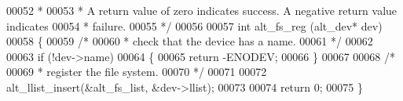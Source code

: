 \begin{DoxyCode}
00052 \textcolor{comment}{ *}
00053 \textcolor{comment}{ * A return value of zero indicates success. A negative return value indicates}
00054 \textcolor{comment}{ * failure. }
00055 \textcolor{comment}{ */}
00056  
00057 \textcolor{keywordtype}{int} alt_fs_reg (alt_dev* dev)
00058 \{
00059   \textcolor{comment}{/*}
00060 \textcolor{comment}{   * check that the device has a name.}
00061 \textcolor{comment}{   */}
00062 
00063   \textcolor{keywordflow}{if} (!dev->name)
00064   \{
00065     \textcolor{keywordflow}{return} -ENODEV;
00066   \}
00067   
00068   \textcolor{comment}{/*}
00069 \textcolor{comment}{   * register the file system.}
00070 \textcolor{comment}{   */}
00071 
00072   alt_llist_insert(&alt_fs_list, &dev->llist);
00073 
00074   \textcolor{keywordflow}{return} 0;
00075 \} 
\end{DoxyCode}
